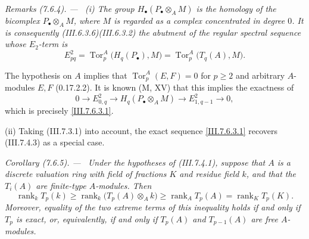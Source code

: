 \documentclass[10pt,oneside]{book}
\newcommand{\Tor}{\operatorname{Tor}}
\newcommand{\sref}[2][]{(#2)}
\newcommand{\oldpage}[2][]{\setcounter{footnote}{0}\marginpar{\scriptsize\textbf{#1}~|~#2}\ignorespaces}
\newenvironment{corollary}[1][]{\par\medskip\noindent\itshape Corollary (#1). ---\ }{\par}
\newenvironment{remarks}[1][]{\par\medskip\noindent\itshape Remarks (#1). ---\ }{\par}
\begin{document}
\begin{remarks}[7.6.4]
\label{III.7.6.4}
\textnormal{(i)}
The group $H_\bullet(P_\bullet\otimes_A M)$ is the homology of
the bicomplex $P_\bullet\otimes_A M$, where $M$ is regarded as
a complex concentrated in degree $0$.  It is consequently
\sref{III.6.3.6}\sref{III.6.3.2} the abutment of the regular
spectral sequence whose $E_2$-term is
\[
  E^2_{pq}
  =
  \Tor_p^A\bigl(H_q(P_\bullet),M\bigr)
  =
  \Tor_p^A\bigl(T_q(A),M\bigr).
\]

\oldpage[III]{194}
The hypothesis on $A$ implies that
$\Tor_p^A(E,F)=0$ for $p\geq 2$ and arbitrary $A$-modules
$E,F$ \sref[0]{0.17.2.2}.  It is known (M, XV) that this
implies the exactness of
\[
  0\longrightarrow E^2_{0,q}
  \longrightarrow H_q(P_\bullet\otimes_A M)
  \longrightarrow E^2_{1,q-1}
  \longrightarrow 0,
\]
which is precisely \eqref{III.7.6.3.1}.

\medskip
\textnormal{(ii)}
Taking \sref{III.7.3.1} into account, the exact sequence
\eqref{III.7.6.3.1} recovers \sref{III.7.4.3} as a special
case.
\end{remarks}

\begin{corollary}[7.6.5]
\label{III.7.6.5}
Under the hypotheses of \sref{III.7.4.1}, suppose that $A$ is
a discrete valuation ring with field of fractions $K$ and
residue field $k$, and that the $T_i(A)$ are finite-type
$A$-modules.  Then
\[
  \operatorname{rank}_k T_p(k)
  \geq
  \operatorname{rank}_k\bigl(T_p(A)\otimes_A k\bigr)
  \geq
  \operatorname{rank}_A T_p(A)
  =
  \operatorname{rank}_K T_p(K).
  \tag{7.6.5.1}\label{III.7.6.5.1}
\]
Moreover, equality of the two extreme terms of this
inequality holds if and only if $T_p$ is exact, or,
equivalently, if and only if $T_p(A)$ and $T_{p-1}(A)$ are
free $A$-modules.
\end{corollary}
\end{document}
